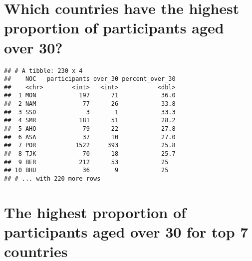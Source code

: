 \documentclass[]{article}
\newenvironment{Shaded}{\begin{snugshade}}{\end{snugshade}}
\newcommand{\KeywordTok}[1]{\textcolor[rgb]{0.13,0.29,0.53}{\textbf{#1}}}
\newcommand{\DataTypeTok}[1]{\textcolor[rgb]{0.13,0.29,0.53}{#1}}
\newcommand{\DecValTok}[1]{\textcolor[rgb]{0.00,0.00,0.81}{#1}}
\newcommand{\StringTok}[1]{\textcolor[rgb]{0.31,0.60,0.02}{#1}}
\newcommand{\OperatorTok}[1]{\textcolor[rgb]{0.81,0.36,0.00}{\textbf{#1}}}
\newcommand{\NormalTok}[1]{#1}
\begin{document}
\section{Which countries have the highest proportion of participants
aged over
30?}\label{which-countries-have-the-highest-proportion-of-participants-aged-over-30}

\begin{Shaded}
\end{Shaded}

\begin{verbatim}
## # A tibble: 230 x 4
##    NOC   participants over_30 percent_over_30
##    <chr>        <int>   <int>           <dbl>
##  1 MON            197      71            36.0
##  2 NAM             77      26            33.8
##  3 SSD              3       1            33.3
##  4 SMR            181      51            28.2
##  5 AHO             79      22            27.8
##  6 ASA             37      10            27.0
##  7 POR           1522     393            25.8
##  8 TJK             70      18            25.7
##  9 BER            212      53            25  
## 10 BHU             36       9            25  
## # ... with 220 more rows
\end{verbatim}

\section{The highest proportion of participants aged over 30 for top 7
countries}\label{the-highest-proportion-of-participants-aged-over-30-for-top-7-countries}
\end{document}
